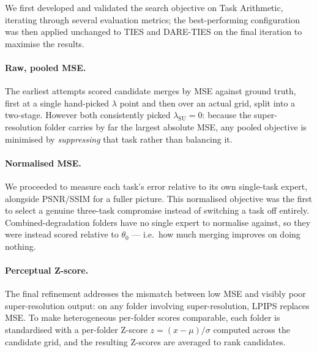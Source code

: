 \documentclass{article}
\begin{document}
We first developed and validated the search objective on Task Arithmetic, iterating through several evaluation metrics; the best-performing configuration was then applied unchanged to TIES and DARE-TIES on the final iteration to maximise the results.

\paragraph*{Raw, pooled MSE.} The earliest attempts scored candidate merges by MSE against ground truth, first at a single hand-picked $\lambda$ point and then over an actual grid, split into a two-stage. However both consistently picked $\lambda_{\mathrm{SU}}=0$: because the super-resolution folder carries by far the largest absolute MSE, any pooled objective is minimised by \emph{suppressing} that task rather than balancing it.

\paragraph*{Normalised MSE.} We proceeded to measure each task's error relative to its own single-task expert, alongside PSNR/SSIM for a fuller picture. This normalised objective was the first to select a genuine three-task compromise instead of switching a task off entirely. Combined-degradation folders have no single expert to normalise against, so they were instead scored relative to $\theta_0$ --- i.e.\ how much merging improves on doing nothing.

\paragraph*{Perceptual Z-score.} The final refinement addresses the mismatch between low MSE and visibly poor super-resolution output: on any folder involving super-resolution, LPIPS replaces MSE. To make heterogeneous per-folder scores comparable, each folder is standardised with a per-folder Z-score $z=(x-\mu)/\sigma$ computed across the candidate grid, and the resulting Z-scores are averaged to rank candidates.
\end{document}
